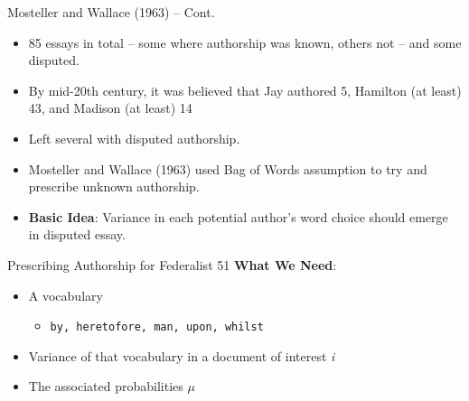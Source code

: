 \documentclass[
  ignorenonframetext,
  aspectratio=169]{beamer}
\begin{document}
\begin{frame}{Mosteller and Wallace (1963) -- Cont.}
\label{mosteller-and-wallace-1963-cont.}
\begin{itemize}
\item 85 essays in total -- some where authorship was known, others not -- and some disputed. \par \vspace{2.5mm}
\item By mid-20th century, it was believed that Jay authored 5, Hamilton (at least) 43, and Madison (at least) 14 \par \vspace{2.5mm}
\item Left several with disputed authorship. \par \vspace{2.5mm}
\item Mosteller and Wallace (1963) used Bag of Words assumption to try and prescribe unknown authorship. \par \vspace{2.5mm}
\item \textbf{Basic Idea}: Variance in each potential author's word choice should emerge in disputed essay.
\end{itemize}
\end{frame}

\begin{frame}{Prescribing Authorship for Federalist 51}
\label{prescribing-authorship-for-federalist-51}
\textbf{What We Need}: \pause

\begin{itemize}
\item A vocabulary \par \vspace{2.5mm} \pause
\begin{itemize}
\item[] \texttt{by, heretofore, man, upon, whilst} \pause
\end{itemize} \par \vspace{2.5mm}
\item Variance of that vocabulary in a document of interest \textit{i} \par \vspace{2.5mm} \pause
\item The associated probabilities $\mu$
\end{itemize}
\end{frame}
\end{document}
